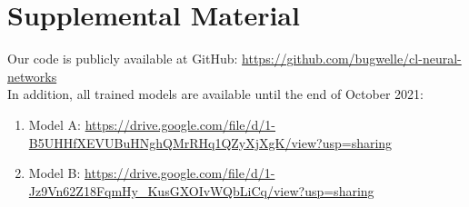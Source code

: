\documentclass[11pt,a4paper]{article}
\begin{document}
\section{Supplemental Material}
\label{sec:supplemental}

Our code is publicly available at GitHub: \url{https://github.com/bugwelle/cl-neural-networks}\\

In addition, all trained models are available until the end of October 2021:
\begin{enumerate}
    \item Model A: \url{https://drive.google.com/file/d/1-B5UHHfXEVUBuHNghQMrRHq1QZyXjXgK/view?usp=sharing}
    \item Model B: \url{https://drive.google.com/file/d/1-Jz9Vn62Z18FqmHy_KusGXOIvWQbLiCq/view?usp=sharing}
\end{enumerate}
\end{document}

